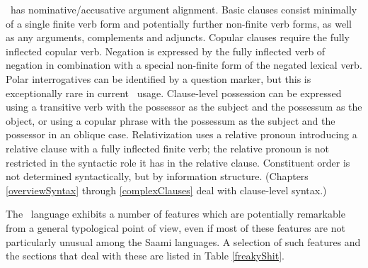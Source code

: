 \PS\ has nominative/accusative argument alignment. 
Basic clauses consist minimally of a single finite verb form and potentially further non-finite verb forms, %
as well as any arguments, complements and adjuncts. Copular clauses require the fully inflected copular verb. Negation is expressed by the fully inflected verb of negation in combination with a special non-finite form of the negated lexical verb. Polar interrogatives can be identified by a question marker, but this is exceptionally rare in current \PS\ usage. Clause-level possession can be expressed using a transitive verb with the possessor as the subject and the possessum as the object, or using a copular phrase with the possessum as the subject and the possessor in an oblique case. Relativization uses a relative pronoun introducing a relative clause with a fully inflected finite verb; the relative pronoun is not restricted in the syntactic role it has in the relative clause. Constituent order is not determined syntactically, but by information structure. (Chapters \ref{overviewSyntax} through \ref{complexClauses} deal with clause-level syntax.) 

The \PS\ language exhibits a number of features which are potentially remarkable from a general typological point of view, even if most of these features are not particularly unusual among the Saami languages. A selection of such features and the sections that deal with these are listed in Table \vref{freakyShit}. 


